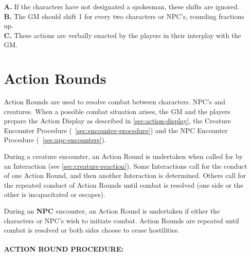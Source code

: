 \begin{table}[htbp]
{\begin{minipage}{0.75\textwidth}
      \medskip

      \parbox{\textwidth}{\textbf{A.} If the characters have not
        designated a spokesman, these shifts are ignored. \\
        \textbf{B.} The GM should shift 1 for every two characters or
        NPC's, rounding fractions up.  \\
        \textbf{C.} These actions are verbally enacted by the players
        in their interplay with the GM.}
    \end{minipage}}
\end{table}

\section{Action Rounds}
\label{sec:action-rounds}



Action Rounds are used to resolve combat between characters. NPC's and
creatures. When a possible combat situation arises, the GM and the
players prepare the Action Display as described in
\ref{sec:action-display}, the Creature Encounter Procedure
(~\ref{sec:encounter-procedure}) and the NPC Encounter Procedure
(~\ref{sec:npc-encounters}).

During a creature encounter, an Action Round is undertaken when called
for by an Interaction (see \ref{sec:creature-reaction}). Some
Interactions call for the conduct of one Action Round, and then
another Interaction is determined. Others call for the repeated
conduct of Action Rounds until combat is resolved (one side or the
other is incapacitated or escapes).

During an \textbf{NPC} encounter, an Action Round is undertaken if
either the characters or NPC's wish to initiate combat. Action Rounds
are repeated until combat is resolved or both sides choose to cease
hostilities.


\paragraph{ACTION ROUND PROCEDURE:}
\label{sec:action-round-procedure}

